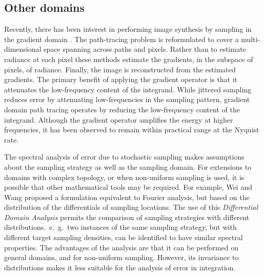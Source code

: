 %
%
%
\subsection{Other domains}

Recently, there has been interest in performing image synthesis by sampling in the gradient domain \cite{}. The path-tracing problem is reformulated to cover a multi-dimensional space spanning across paths and pixels. Rather than to estimate radiance at each pixel these methods estimate the gradients, in the subspace of pixels, of radiance. Finally, the image is reconstructed from the estimated gradients. The primary benefit of applying the gradient operator is that it attenuates the low-frequency content of the integrand. While jittered sampling reduces error by attenuating low-frequencies in the sampling pattern, gradient domain path tracing operates by reducing the low-frequency content of the integrand.  Although the gradient operator amplifies the energy at higher frequencies, it has been observed to remain within practical range at the Nyquist rate.

The spectral analysis of error due to stochastic sampling makes assumptions about the sampling strategy as well as the sampling domain. For extensions to domains with complex topology, or when non-uniform sampling is used, it is possible that other mathematical tools may be required. For example, Wei and Wang \cite{} proposed a formulation equivalent to Fourier analysis, but based on the distribution of the differentials of sampling locations. The use of this \textit{Differential Domain Analysis} permits the comparison of sampling strategies with different distributions.~e.~g.~two instances of the same sampling strategy, but with different target sampling densities, can be identified to have similar spectral properties. The advantages of the analysis are that it can be performed on general domains, and for non-uniform sampling. However, its invariance to distributions makes it less suitable for the analysis of error in integration. 


  
%
%

%
%
%
